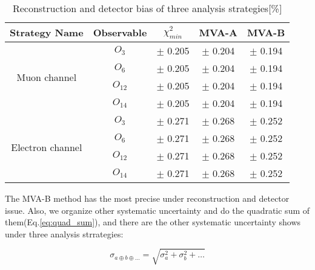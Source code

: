 		\begin{center}
		\setlength{\tabcolsep}{12pt}
		\begin{longtable}{ | c | c | c c c | }
		\caption{Reconstruction and detector bias of three analysis strategies[\%]} \\
		\hline
		Strategy Name & Observable & $\chi^2_{min}$ & MVA-A & MVA-B \\ 
		\hline
		\multirow{4}{5em}{Muon channel} & $O_{3}$ & $\pm$ 0.205 & $\pm$ 0.204 & $\pm$ 0.194 \\ 
		 & $O_{6}$ & $\pm$ 0.205 & $\pm$ 0.204 & $\pm$ 0.194 \\ 
		 & $O_{12}$ & $\pm$ 0.205 & $\pm$ 0.204 & $\pm$ 0.194 \\ 
		 & $O_{14}$ & $\pm$ 0.205 & $\pm$ 0.204 & $\pm$ 0.194 \\ 
		 \hline
		\multirow{4}{5em}{Electron channel} & $O_{3}$ & $\pm$ 0.271 & $\pm$ 0.268 & $\pm$ 0.252 \\ 
		 & $O_{6}$ & $\pm$ 0.271 & $\pm$ 0.268 & $\pm$ 0.252 \\ 
		 & $O_{12}$ & $\pm$ 0.271 & $\pm$ 0.268 & $\pm$ 0.252 \\ 
		 & $O_{14}$ & $\pm$ 0.271 & $\pm$ 0.268 & $\pm$ 0.252 \\ 
		\hline
		\end{longtable}
		\end{center}
		\FloatBarrier
		
		The MVA-B method has the most precise under reconstruction and detector issue. Also, we organize other systematic uncertainty and do the quadratic sum of them(Eq.\ref{eq:quad_sum}), and there are the other systematic uncertainty shows under three analysis strrategies:

		\begin{equation}
		\sigma_{a \oplus b \oplus \ldots} = \sqrt{ \sigma_{a}^2 + \sigma_b^2 + \ldots }
		\label{eq:quad_sum}
		\end{equation}
		\FloatBarrier

